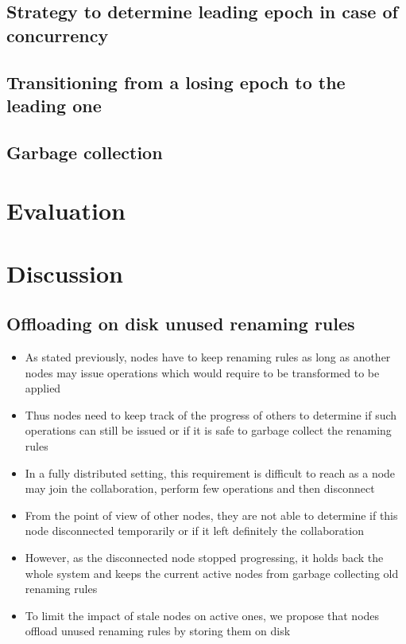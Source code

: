 \documentclass{article}
\begin{document}
\subsection{Strategy to determine leading epoch in case of concurrency}
\subsection{Transitioning from a losing epoch to the leading one}
\subsection{Garbage collection}

\section{Evaluation}

\section{Discussion}

\subsection{Offloading on disk unused renaming rules}

\begin{itemize}
    \item As stated previously, nodes have to keep renaming rules as long as another nodes may issue operations which would require to be transformed to be applied
    \item Thus nodes need to keep track of the progress of others to determine if such operations can still be issued or if it is safe to garbage collect the renaming rules
    \item In a fully distributed setting, this requirement is difficult to reach as a node may join the collaboration, perform few operations and then disconnect
    \item From the point of view of other nodes, they are not able to determine if this node disconnected temporarily or if it left definitely the collaboration
    \item However, as the disconnected node stopped progressing, it holds back the whole system and keeps the current active nodes from garbage collecting old renaming rules
    \item To limit the impact of stale nodes on active ones, we propose that nodes offload unused renaming rules by storing them on disk
\end{itemize}
\end{document}

